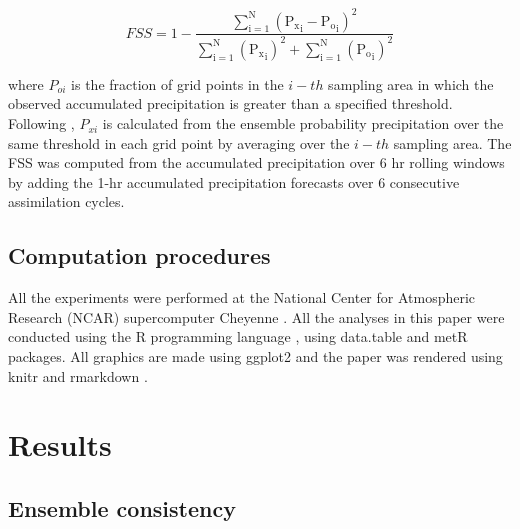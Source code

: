 \documentclass[final,5p,times,twocolumn,authoryear]{elsarticle} %
\begin{document}
\begin{equation}
  \mathrm{\mathit{FSS} = 1-\frac{\sum_{i=1}^{N} ({P_x}_i-{P_o}_i)^{2}}{\sum_{i=1}^{N} ({P_x}_i)^{2}+\sum_{i=1}^{N} ({P_o}_i)^{2}}}
  \label{eq:eq7}
\end{equation}

where \(P_{oi}\) is the fraction of grid points in the \(i-th\) sampling area in which the observed accumulated precipitation is greater than a specified threshold. Following \citet{roberts2020}, \(P_{xi}\) is calculated from the ensemble probability precipitation over the same threshold in each grid point by averaging over the \(i-th\) sampling area.
The FSS was computed from the accumulated precipitation over 6 hr rolling windows by adding the 1-hr accumulated precipitation forecasts over 6 consecutive assimilation cycles.

\hypertarget{computation-procedures}{%
\subsection{Computation procedures}\label{computation-procedures}}

All the experiments were performed at the National Center for Atmospheric Research (NCAR) supercomputer Cheyenne \citep{Cheyenne2019}. All the analyses in this paper were conducted using the R programming language \citep{rcoreteam2020}, using data.table \citep{dowle2020} and metR \citep{campitelli2020} packages.
All graphics are made using ggplot2 \citep{wickham2009} and the paper was rendered using knitr and rmarkdown \citep{xie2015, allaire2019}.

\hypertarget{results}{%
\section{Results}\label{results}}

\hypertarget{ensemble-consistency}{%
\subsection{Ensemble consistency}\label{ensemble-consistency}}
\end{document}

